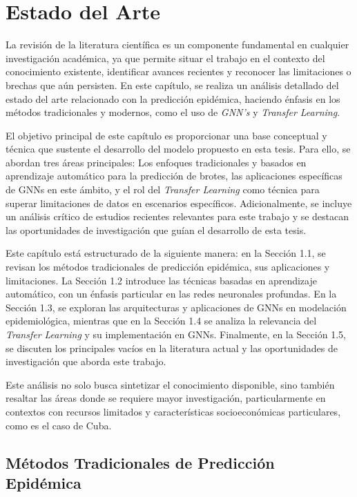 \chapter{Estado del Arte}\label{chapter:state-of-the-art}

La revisión de la literatura científica es un componente fundamental en cualquier investigación académica, ya que permite situar el trabajo en el contexto del conocimiento existente, identificar avances recientes y reconocer las limitaciones o brechas que aún persisten. En este capítulo, se realiza un análisis detallado del estado del arte relacionado con la predicción epidémica, haciendo énfasis en los métodos tradicionales y modernos, como el uso de \textit{GNN's}  y \textit{Transfer Learning}. 

El objetivo principal de este capítulo es proporcionar una base conceptual y técnica que sustente el desarrollo del modelo propuesto en esta tesis. Para ello, se abordan tres áreas principales: Los enfoques tradicionales y basados en aprendizaje automático para la predicción de brotes, las aplicaciones específicas de GNNs en este ámbito, y el rol del \textit{Transfer Learning} como técnica para superar limitaciones de datos en escenarios específicos. Adicionalmente, se incluye un análisis crítico de estudios recientes relevantes para este trabajo y se destacan las oportunidades de investigación que guían el desarrollo de esta tesis.

Este capítulo está estructurado de la siguiente manera: en la Sección 1.1, se revisan los métodos tradicionales de predicción epidémica, sus aplicaciones y limitaciones. La Sección 1.2 introduce las técnicas basadas en aprendizaje automático, con un énfasis particular en las redes neuronales profundas. En la Sección 1.3, se exploran las arquitecturas y aplicaciones de GNNs en modelación epidemiológica, mientras que en la Sección 1.4 se analiza la relevancia del \textit{Transfer Learning} y su implementación en GNNs. Finalmente, en la Sección 1.5, se discuten los principales vacíos en la literatura actual y las oportunidades de investigación que aborda este trabajo.

Este análisis no solo busca sintetizar el conocimiento disponible, sino también resaltar las áreas donde se requiere mayor investigación, particularmente en contextos con recursos limitados y características socioeconómicas particulares, como es el caso de Cuba.

\section{Métodos Tradicionales de Predicción Epidémica}\label{section:traditional-methods}

